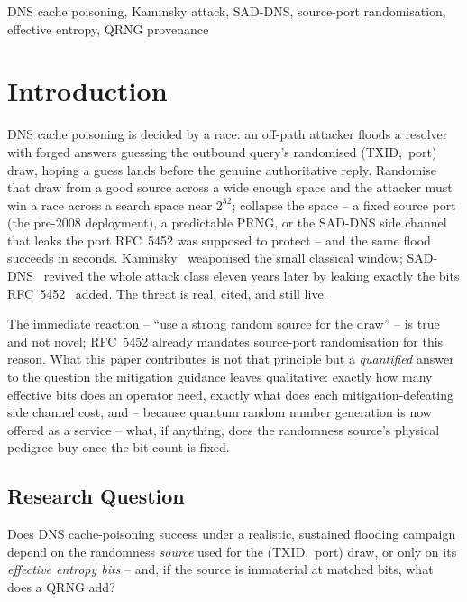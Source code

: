 \documentclass[conference]{IEEEtran}
\begin{document}
\begin{IEEEkeywords}
DNS cache poisoning, Kaminsky attack, SAD-DNS, source-port randomisation, effective entropy, QRNG
provenance
\end{IEEEkeywords}

\section{Introduction}

DNS cache poisoning is decided by a race: an off-path attacker floods a resolver with forged answers
guessing the outbound query's randomised \mbox{(TXID, port)} draw, hoping a guess lands before the
genuine authoritative reply. Randomise that draw from a good source across a wide enough space and the
attacker must win a race across a search space near $2^{32}$; collapse the space -- a fixed source port
(the pre-2008 deployment), a predictable PRNG, or the SAD-DNS side channel that leaks the port RFC~5452
was supposed to protect -- and the same flood succeeds in seconds. Kaminsky~\cite{kaminsky} weaponised
the small classical window; SAD-DNS~\cite{saddns} revived the whole attack class eleven years later by
leaking exactly the bits RFC~5452~\cite{rfc5452} added. The threat is real, cited, and still live.

The immediate reaction -- ``use a strong random source for the draw'' -- is true and not novel; RFC~5452
already mandates source-port randomisation for this reason. What this paper contributes is not that
principle but a \emph{quantified} answer to the question the mitigation guidance leaves qualitative:
exactly how many effective bits does an operator need, exactly what does each mitigation-defeating
side channel cost, and -- because quantum random number generation is now offered as a service -- what,
if anything, does the randomness source's physical pedigree buy once the bit count is fixed.

\subsection*{Research Question}
Does DNS cache-poisoning success under a realistic, sustained flooding campaign depend on the randomness
\emph{source} used for the \mbox{(TXID, port)} draw, or only on its \emph{effective entropy bits} --
and, if the source is immaterial at matched bits, what does a QRNG add?
\end{document}
